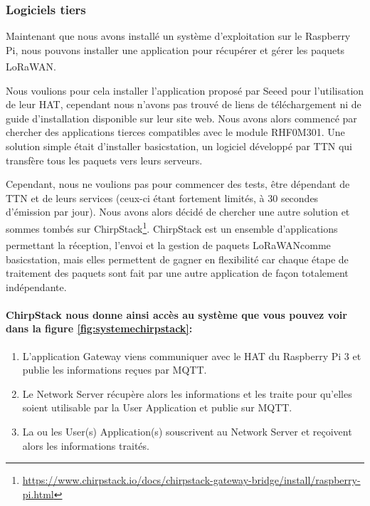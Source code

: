 \documentclass{article}
\begin{document}
			\subsubsection{Logiciels tiers}
				Maintenant que nous avons installé un système d'exploitation sur le Raspberry Pi, nous pouvons installer une application pour récupérer et gérer les paquets LoRaWAN\textsuperscript\textregistered.
				
				Nous voulions pour cela installer l'application proposé par Seeed pour l'utilisation de leur HAT, cependant nous n'avons pas trouvé de liens de téléchargement ni de guide d'installation disponible sur leur site web. 
				Nous avons alors commencé par chercher des applications tierces compatibles avec le module RHF0M301. Une solution simple était d'installer basicstation, un logiciel développé par TTN qui transfère tous les paquets vers leurs serveurs.
				
				Cependant, nous ne voulions pas pour commencer des tests, être dépendant de TTN et de leurs services (ceux-ci étant fortement limités, à 30 secondes d'émission par jour).
				Nous avons alors décidé de chercher une autre solution et sommes tombés sur ChirpStack\footnote{\url{https://www.chirpstack.io/docs/chirpstack-gateway-bridge/install/raspberry-pi.html}}. ChirpStack est un ensemble d'applications permettant la réception, l'envoi et la gestion de paquets LoRaWAN\textsuperscript\textregistered comme basicstation, mais elles permettent de gagner en flexibilité car chaque étape de traitement des paquets sont fait par une autre application de façon totalement indépendante.
				
				\paragraph{ChirpStack nous donne ainsi accès au système que vous pouvez voir dans la figure \ref{fig:systemechirpstack}:}
				\begin{enumerate}
					\item L'application Gateway viens communiquer avec le HAT du Raspberry Pi 3 et publie les informations reçues par MQTT.
					\item Le Network Server récupère alors les informations et les traite pour qu'elles soient utilisable par la User Application et publie sur MQTT.
					\item La ou les User(s) Application(s) souscrivent au Network Server et reçoivent alors les informations traités.
				\end{enumerate}
\end{document}
